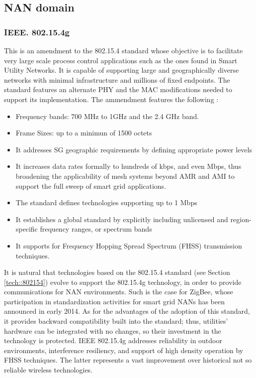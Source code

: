 \documentclass[11pt,draftclsnofoot,onecolumn]{IEEEtran}
\begin{document}
\subsection{NAN domain}

\subsubsection{IEEE. 802.15.4g}\label{tech::802154g}

This is an amendment to the 802.15.4 standard whose objective is to facilitate very large scale process control applications such as the ones found in Smart Utility Networks. It is capable of supporting large and geographically diverse networks with minimal infrastructure and millions of fixed endpoints. The standard features an alternate PHY and the MAC modifications needed to support its implementation. The ammendment features the following \cite{Shin2010}:

\begin{itemize}

	\item Frequency bands: 700 MHz to 1GHz and the 2.4 GHz band.
	\item Frame Sizes: up to a minimun of 1500 octets
	\item It addresses SG geographic requirements by defining appropriate power levels
	\item It increases data rates formally to hundreds of kbps, and even Mbps, thus broadening the applicability of mesh systems beyond AMR and AMI to support the full sweep of smart grid applications. 
	\item The standard defines technologies supporting up to 1 Mbps
	\item It establishes a global standard by explicitly including unlicensed and region-specific frequency ranges, or spectrum bands
	\item It supports for Frequency Hopping Spread Spectrum (FHSS) transmission techniques.

\end{itemize}

It is natural that technologies based on the 802.15.4 standard (see Section \ref{tech::802154}) evolve to support the 802.15.4g technology, in order to provide communications for NAN environments. Such is the case for ZigBee, whose participation in standardization activities for smart grid NANs has been announced in early 2014. As for the advantages of the adoption of this standard, it provides backward compatibility built into the standard; thus, utilities' hardware can be integrated with no changes, so their investment in the technology is protected. IEEE 802.15.4g addresses reliability in outdoor environments, interference resiliency, and support of high density operation by FHSS techniques. The latter represents a vast improvement over historical not so reliable wireless technologies.
\end{document}
